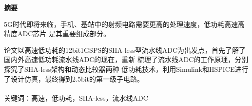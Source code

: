 \begin{center}
    \bfseries {} 摘要
\end{center}
\par 5G时代即将来临，手机、基站中的射频电路需要更高的处理速度，低功耗高速高精度ADC芯片
是其重要组成部分。
\par 论文以高速低功耗的12bit1GSPS的SHA-less型流水线ADC为出发点，首先了解了
国内外高速低功耗流水线ADC的现在，重新
梳理了流水线ADC的工作原理，分别探究了SHA-less架构和动态比较器两种
低功耗技术，利用Simulink和HSPICE进行了设计仿真，最终得到2.5bit的第一级子电路。\\
\\
关键词：高速，低功耗，SHA-less，流水线ADC
